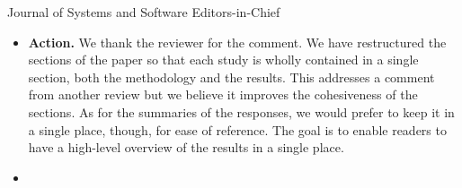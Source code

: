 \documentclass{letter}
\begin{document}
\begin{letter}{Journal of Systems and Software Editors-in-Chief}
\begin{itemize}
{\bf Answer.} This could only be observed with statistical significance for three of the atoms, after p-value correction. Effect sizes are also mostly very small and they are not affected by sample sizes, differently from the p-values. This combination of results makes it difficult to formulate hypotheses beyond the obvious: that obfuscated snippets are slightly more confusing than the cleaned ones, with few exceptions. 


\item {}

{\bf Action.} We thank the reviewer for the comment. We have restructured the sections of the paper so that each study is wholly contained in a single section, both the methodology and the results. This addresses a comment from another review but we believe it improves the cohesiveness of the sections. As for the summaries of the responses, we would prefer to keep it in a single place, though, for ease of reference. The goal is to enable readers to have a high-level overview of the results in a single place. 


\item {}


\end{itemize}
\end{letter}
\end{document}
